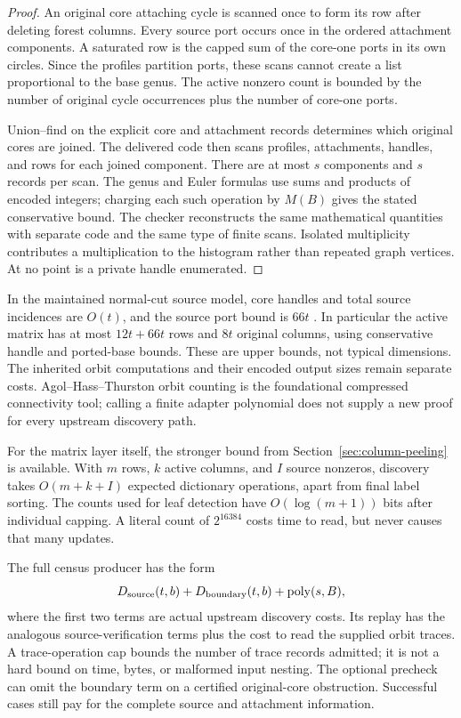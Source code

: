\begin{proof}
An original core attaching cycle is scanned once to form its row after
deleting forest columns.  Every source port occurs once in the ordered
attachment components.  A saturated row is the capped sum of the core-one
ports in its own circles.  Since the profiles partition ports, these scans
cannot create a list proportional to the base genus.  The active nonzero
count is bounded by the number of original cycle occurrences plus the
number of core-one ports.

Union--find on the explicit core and attachment records determines which
original cores are joined.  The delivered code then scans profiles,
attachments, handles, and rows for each joined component.  There are at
most $s$ components and $s$ records per scan.  The genus and Euler formulas
use sums and products of encoded integers; charging each such operation
by $M(B)$ gives the stated conservative bound.  The checker reconstructs
the same mathematical quantities with separate code and the same type of
finite scans.  Isolated multiplicity contributes a multiplication to the
histogram rather than repeated graph vertices.  At no point is a private
handle enumerated.
\end{proof}

In the maintained normal-cut source model, core handles and total source
incidences are $O(t)$, and the source port bound is $66t$
\cite{marked-parallelity-85}.  In particular the active matrix has at most
$12t+66t$ rows and $8t$ original columns, using conservative handle and
ported-base bounds.  These are upper bounds, not typical dimensions.
The inherited orbit computations and their encoded output sizes remain
separate costs.  Agol--Hass--Thurston orbit counting is the foundational
compressed connectivity tool\cite{AHT2006}; calling a finite adapter
polynomial does not supply a new proof for every upstream discovery path.

For the matrix layer itself, the stronger bound from
Section~\ref{sec:column-peeling} is available.  With $m$ rows, $k$ active
columns, and $I$ source nonzeros, discovery takes $O(m+k+I)$ expected
dictionary operations, apart from final label sorting.  The counts used
for leaf detection have $O(\log(m+1))$ bits after individual capping.  A
literal count of $2^{16384}$ costs time to read, but never causes that many
updates.

The full census producer has the form
\[
 D_{\rm source}(t,b)+D_{\rm boundary}(t,b)
 +\operatorname{poly}(s,B),
\]
where the first two terms are actual upstream discovery costs.  Its replay
has the analogous source-verification terms plus the cost to read the
supplied orbit traces.  A trace-operation cap bounds the number of trace
records admitted; it is not a hard bound on time, bytes, or malformed
input nesting.  The optional precheck can omit the boundary term on a
certified original-core obstruction.  Successful cases still pay for the
complete source and attachment information.

